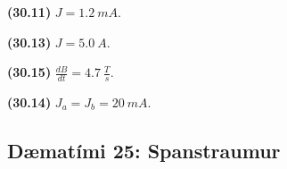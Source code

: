 \begin{tcolorbox}
\begin{enumerate*}[label = ]
  \item \textbf{(30.11)} $J = \SI{1.2}{mA}$.
  \item \textbf{(30.13)} $J = \SI{5.0}{A}$.
  \item \textbf{(30.15)} $\frac{dB}{dt} = \SI{4.7}{\frac{T}{s}}$.
  \item \textbf{(30.14)} $J_a = J_b = \SI{20}{mA}$.
\end{enumerate*}
\end{tcolorbox}


\newpage

\subsection*{Dæmatími 25: Spanstraumur}

